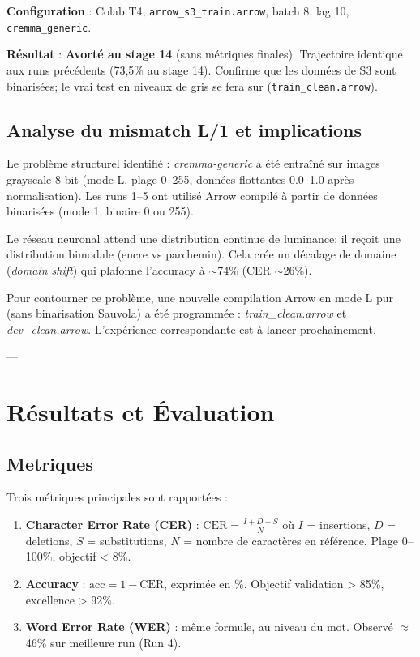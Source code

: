 ﻿\documentclass[twoside,twocolumn,10pt]{article}
\begin{document}
\textbf{Configuration} : Colab T4, \texttt{arrow\_s3\_train.arrow}, batch 8, lag 10, \texttt{cremma\_generic}.

\textbf{Résultat} : \textbf{Avorté au stage 14} (sans métriques finales). Trajectoire identique aux runs précédents (73,5\% au stage 14). Confirme que les données de S3 sont binarisées; le vrai test en niveaux de gris se fera sur (\texttt{train\_clean.arrow}).

\subsection{Analyse du mismatch L/1 et implications}

Le problème structurel identifié : \textit{cremma-generic} a été entraîné sur images grayscale 8-bit (mode L, plage 0--255, données flottantes 0.0--1.0 après normalisation). Les runs 1--5 ont utilisé Arrow compilé à partir de données binarisées (mode 1, binaire 0 ou 255).

Le réseau neuronal attend une distribution continue de luminance; il reçoit une distribution bimodale (encre vs parchemin). Cela crée un décalage de domaine (\textit{domain shift}) qui plafonne l'accuracy à $\sim$74\% (CER $\sim$26\%).

Pour contourner ce problème, une nouvelle compilation Arrow en mode L pur (sans binarisation Sauvola) a été programmée : \textit{train\_clean.arrow} et \textit{dev\_clean.arrow}. L'expérience correspondante est à lancer prochainement.

---

\section{Résultats et Évaluation}
\fontsize{11}{13}\selectfont
\justifying

\subsection{Metriques}

Trois métriques principales sont rapportées :

\begin{enumerate}
  \item \textbf{Character Error Rate (CER)} \cite{cer_wer_metrics2006} : $\text{CER} = \frac{I + D + S}{N}$ où $I$ = insertions, $D$ = deletions, $S$ = substitutions, $N$ = nombre de caractères en référence. Plage 0--100\%, objectif < 8\%.
  
  \item \textbf{Accuracy} : $\text{acc} = 1 - \text{CER}$, exprimée en \%. Objectif validation > 85\%, excellence > 92\%.
  
  \item \textbf{Word Error Rate (WER)} \cite{cer_wer_metrics2006} : même formule, au niveau du mot. Observé $\approx$46\% sur meilleure run (Run 4).
\end{enumerate}
\end{document}
